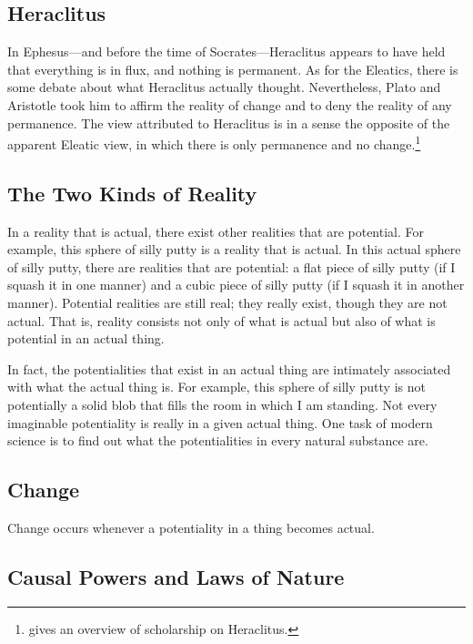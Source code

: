 \documentclass[twocolumn]{article}
\begin{document}
\subsection{Heraclitus}

In Ephesus---and before the time of Socrates---Heraclitus appears to have held
that everything is in flux, and nothing is permanent.  As for the Eleatics,
there is some debate about what Heraclitus actually thought.  Nevertheless,
Plato and Aristotle took him to affirm the reality of change and to deny the
reality of any permanence.  The view attributed to Heraclitus is in a sense the
opposite of the apparent Eleatic view, in which there is only permanence and no
change.\footnote{%
   \cite{g2015} gives an overview of scholarship on Heraclitus.%
}

\subsection{The Two Kinds of Reality}

In a reality that is actual, there exist other realities that are potential.
For example, this sphere of silly putty is a reality that is actual.  In this
actual sphere of silly putty, there are realities that are potential: a flat
piece of silly putty (if I squash it in one manner) and a cubic piece of silly
putty (if I squash it in another manner).  Potential realities are still real;
they really exist, though they are not actual.  That is, reality consists not
only of what is actual but also of what is potential in an actual thing.

In fact, the potentialities that exist in an actual thing are intimately
associated with what the actual thing is.  For example, this sphere of silly
putty is not potentially a solid blob that fills the room in which I am
standing.  Not every imaginable potentiality is really in a given actual thing.
One task of modern science is to find out what the potentialities in every
natural substance are.

\subsection{Change}

Change occurs whenever a potentiality in a thing becomes actual.

\subsection{Causal Powers and Laws of Nature}
\end{document}

